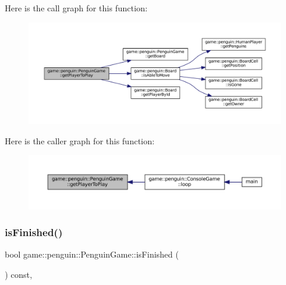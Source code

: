 Here is the call graph for this function\+:
\nopagebreak
\begin{figure}[H]
\begin{center}
\leavevmode
\includegraphics[width=350pt]{classgame_1_1penguin_1_1_penguin_game_aac449b76f27098b1d2218cc51e7f70b4_cgraph}
\end{center}
\end{figure}
Here is the caller graph for this function\+:
\nopagebreak
\begin{figure}[H]
\begin{center}
\leavevmode
\includegraphics[width=350pt]{classgame_1_1penguin_1_1_penguin_game_aac449b76f27098b1d2218cc51e7f70b4_icgraph}
\end{center}
\end{figure}
\mbox{\label{classgame_1_1penguin_1_1_penguin_game_ae5e55157da5e8a1ed2ccc2c9cbbad50d}} 
\subsubsection{\texorpdfstring{is\+Finished()}{isFinished()}}
{\footnotesize\ttfamily bool game\+::penguin\+::\+Penguin\+Game\+::is\+Finished (\begin{DoxyParamCaption}{ }\end{DoxyParamCaption}) const\hspace{0.3cm}{\ttfamily [override]}, {\ttfamily [virtual]}}



